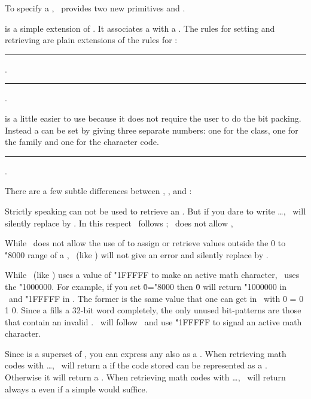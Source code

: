 To specify a , \HiTeX\ provides
two new primitives  and .

 is a simple extension of .
It associates a  with a .
The rules for setting and retrieving are plain extensions of the rules for :
\medskip
\rule{}:
.
\rule{}:
 \opt{\.{=}} .
\medskip

 is a little easier to use because it does not require
the user to do the bit packing. Instead a  can be set by
giving three separate numbers: one for the class, one for the family and
one for the character code. 
\medskip
\rule{}:
 \opt{\.{=}}
      .
\medskip

\noindent There are a few subtle differences between \XeTeX, \LuaTeX, and \HiTeX:
\itemize
\item Strictly speaking  can not be used to retrieve an .
But if you dare to write \dots, \HiTeX\ will silently
replace  by . In this respect \HiTeX\ follows \LuaTeX;
\XeTeX\ does not allow ,

\item While \XeTeX\ does not allow the use of  to assign or retrieve values outside the 0 to \.{"8000} range of a ,
\HiTeX\ (like \LuaTeX) will not give an error and silently replace  by .


\item While \HiTeX\ (like \XeTeX) uses a  value of \.{"1FFFFF} to make an active math character,
\LuaTeX\ uses the  \.{"1000000}.
For example, if you set \.{0="8000} then \.0
will return \.{"1000000} in \LuaTeX\ and \.{"1FFFFF} in \XeTeX.
The former is the same value that one can get in \LuaTeX\ with \.{0 = 0 1 0}.
Since a  fills a 32-bit word completely, the only unused bit-patterns
are those that contain an invalid  .
\HiTeX\ will follow \XeTeX\ and use  \.{"1FFFFF} to signal an active math character.

\item Since  is a superset of  ,
you can express any   also as a .
When retrieving math codes with \dots, \HiTeX\
will return a  if the code stored can be represented as a .
Otherwise it will return a .
When retrieving math codes with \dots, \HiTeX\ will return
always a \sym{Umath code} even if a simple \sym{math code} would suffice.
\enditemize


